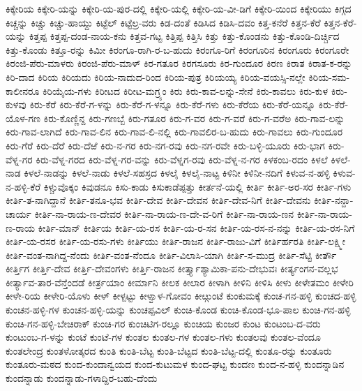 ಕಿಕ್ಕೇರಿಯ
ಕಿಕ್ಕೇರಿ-ಯನ್ನು
ಕಿಕ್ಕೇರಿ-ಯ-ಪುರ-ದಲ್ಲಿ
ಕಿಕ್ಕೇರಿ-ಯಲ್ಲಿ
ಕಿಕ್ಕೇರಿ-ಯ-ವೀ-ಡಿಗೆ
ಕಿಕ್ಕೇರಿ-ಯಿಂದ
ಕಿಕ್ಕೇರಿಯು
ಕಿಗ್ಗದ
ಕಿಚ್ಚನ್ನು
ಕಿಚ್ಚು
ಕಿಚ್ಚು-ಹಾಯ್ದು
ಕಿಟ್ಟೆಲ್
ಕಿಟ್ಟೆಲ್ರ-ವರು
ಕಿಡ-ದಂತೆ
ಕಿಡಿಸಿದ
ಕಿಡಿಸಿ-ದವಂ
ಕಿತ್ತ-ಕನೆರೆ
ಕಿತ್ತನ-ಕೆರೆ
ಕಿತ್ತನ-ಕೆರೆ-ಯನ್ನು
ಕಿತ್ತಪ್ಪ
ಕಿತ್ತಪ್ಪ-ದಂಡ-ನಾಯ-ಕನು
ಕಿತ್ತವ-ಗಟ್ಟ
ಕಿತ್ತಿಪ್ಪ
ಕಿತ್ತಿಸಿ
ಕಿತ್ತು
ಕಿತ್ತು-ಕೊಂಡನು
ಕಿತ್ತು-ಕೊಂಡಿ-ದಿರ್ಚ್ಚಿದ
ಕಿತ್ತು-ಕೊಂಡು
ಕಿತ್ತೂ-ರನ್ನು
ಕಿಮೀ
ಕಿರಂಗೂ-ರಾಗಿ-ರ-ಬ-ಹುದು
ಕಿರಂಗೂ-ರಿಗೆ
ಕಿರಂಗೂರಿನ
ಕಿರಂಗೂರು
ಕಿರಂಗೂರೇ
ಕಿರಂಜಿ-ಪೆರು-ಮಾಳರು
ಕಿರಂಜಿ-ಪೆರು-ಮಾಳ್
ಕಿರ-ಗತೂರ
ಕಿರಗಸೂರು
ಕಿರ-ಗುಂದೂರ
ಕಿರಣ
ಕಿರಾತ
ಕಿರಾತ-ಕ-ರನ್ನು
ಕಿರಿ-ದಾದ
ಕಿರಿಯ
ಕಿರಿಯದು
ಕಿರಿಯ-ನಾದುದ-ರಿಂದ
ಕಿರಿಯ-ಪುತ್ರ
ಕಿರಿಯಯ್ಯ
ಕಿರಿಯ-ವಯಸ್ಸಿ-ನಲ್ಲೇ
ಕಿರಿಯ-ಸಮ-ಕಾಲೀನರೂ
ಕಿರಿಯೈಯ-ಗಳು
ಕಿರೀಟದ
ಕಿರೀಟ-ಮಗ್ರ್ಯಂ
ಕಿರು
ಕಿರು-ಕಾವ-ಲನ್ನು-ಸೇನೆ
ಕಿರು-ಕಾವಲು
ಕಿರು-ಕುಳ
ಕಿರು-ಕುಳವು
ಕಿರು-ಕೆರೆ
ಕಿರು-ಕೆರೆ-ಗ-ಳನ್ನು
ಕಿರು-ಕೆರೆ-ಗ-ಳನ್ನೂ
ಕಿರು-ಕೆರೆ-ಗಳು
ಕಿರು-ಕೆರೆಯ
ಕಿರು-ಕೆರೆ-ಯನ್ನೂ
ಕಿರು-ಕೆರೆ-ಯೊಳ-ಗಣ
ಕಿರು-ಕೊಣ್ಣಿನ್ದ
ಕಿರು-ಗಣಬ್ಬೆ
ಕಿರು-ಗತೂರ
ಕಿರು-ಗ-ವರ
ಕಿರು-ಗ-ವರೆ
ಕಿರು-ಗ-ವರೆಅ
ಕಿರು-ಗಾವ-ಲನ್ನು
ಕಿರು-ಗಾವ-ಲಾಗಿದೆ
ಕಿರು-ಗಾವ-ಲಿನ
ಕಿರು-ಗಾವ-ಲಿ-ನಲ್ಲಿ
ಕಿರು-ಗಾವಲಿರ-ಬ-ಹುದು
ಕಿರು-ಗಾವಲು
ಕಿರು-ಗುಂದೂರ
ಕಿರು-ಗೆರೆ
ಕಿರು-ದೆರೆ
ಕಿರು-ದೆಱೆ
ಕಿರು-ನ-ಗರ
ಕಿರು-ನಗ-ರವು
ಕಿರು-ನಗ-ರವೇ
ಕಿರು-ಬಳ್ಳಿ-ಯೂರು
ಕಿರು-ಭಾಗ
ಕಿರು-ವೆಳ್ನ-ಗರ
ಕಿರು-ವೆಳ್ನ-ಗರದ
ಕಿರು-ವೆಳ್ನ-ಗರ-ವನ್ನು
ಕಿರು-ವೆಳ್ನಗ-ರವು
ಕಿರು-ವೆಳ್ನ-ನ-ಗರ
ಕಿಳಕಂಬ-ರದಂ
ಕಿಳಲೆ
ಕಿಳಲೆ-ನಾಡ
ಕಿಳಲೆ-ನಾಡನ್ನು
ಕಿಳಲೆ-ನಾಡು
ಕಿಳಲೆ-ಸಹಸ್ರದ
ಕಿಳಲೈ
ಕಿಳಲೈ-ನಾಟ್ಟ
ಕಿಳಿನೀ
ಕಿಳಿನೀ-ನದಿಗೆ
ಕಿಳುವ-ನ-ಹಳ್ಳಿ
ಕಿಳುವ-ನ-ಹಳ್ಳಿ-ಕೆರೆ
ಕಿಳ್ಚುವೊಕ್ಕಂ
ಕಿವುಡನೂ
ಕಿಸು-ಕಾಡು
ಕಿಸುಕಾಡೆಪ್ಪತ್ತು
ಕೀರ್ತನೆ-ಯಲ್ಲಿ
ಕೀರ್ತಿ
ಕೀರ್ತಿ-ಅರ-ಸರ
ಕೀರ್ತಿ-ಗಳು
ಕೀರ್ತಿ-ತ-ನಾಗಿದ್ದಾನೆ
ಕೀರ್ತಿ-ತನೂ-ಭವ
ಕೀರ್ತಿ-ದೇವ
ಕೀರ್ತಿ-ದೇವನ
ಕೀರ್ತಿ-ದೇವ-ನಿಗೆ
ಕೀರ್ತಿ-ದೇವನು
ಕೀರ್ತಿ-ನನ್ದಾ-ಚಾರ್ಯ
ಕೀರ್ತಿ-ನಾ-ರಾಯ-ಣ-ದೇವರ
ಕೀರ್ತಿ-ನಾ-ರಾಯ-ಣ-ದೇ-ವ-ರಿಗೆ
ಕೀರ್ತಿ-ನಾ-ರಾಯ-ಣನ
ಕೀರ್ತಿ-ನಾ-ರಾಯ-ಣ-ರಾಯ
ಕೀರ್ತಿ-ಮಾನ್
ಕೀರ್ತಿಯ
ಕೀರ್ತಿ-ಯ-ರಸ
ಕೀರ್ತಿ-ಯ-ರ-ಸನ
ಕೀರ್ತಿ-ಯ-ರಸ-ನ-ನನ್ನು
ಕೀರ್ತಿ-ಯ-ರಸ-ನಿಗೆ
ಕೀರ್ತಿ-ಯ-ರಸರ
ಕೀರ್ತಿ-ಯ-ರಸು-ಗಳು
ಕೀರ್ತಿಯು
ಕೀರ್ತಿ-ರಾಜನ
ಕೀರ್ತಿ-ರಾಜು-ವಿಗೆ
ಕೀರ್ತಿರ್ಹರತಿ
ಕೀರ್ತಿ-ಲಕ್ಷ್ಮೀ
ಕೀರ್ತಿ-ವಂತ-ನಾಗಿದ್ದ-ನೆಂದು
ಕೀರ್ತಿ-ವಂತ-ನೆಂದೂ
ಕೀರ್ತಿ-ವಿಲಾಸಿ-ಯಾಗಿ
ಕೀರ್ತಿ-ಸ-ಮುದ್ರ
ಕೀರ್ತಿ-ಸೆಟ್ಟಿ
ಕೀರ್ತೌ
ಕೀರ್ತ್ತಿಗ
ಕೀರ್ತ್ತಿ-ದೇವ
ಕೀರ್ತ್ತಿ-ದೇವಂಗಳು
ಕೀರ್ತ್ತಿ-ರಾಜನ
ಕೀರ್ತ್ತ್ಯಾಶ್ಯಾಮಿಕಾ-ಪನು-ದೇಭುವಃ
ಕೀರ್ತ್ಯಂಗನ-ವಲ್ಲಭ
ಕೀರ್ತ್ಯಾವ-ತಾರ-ವೆನ್ತೆಂದಡೆ
ಕೀರ್ತ್ರಯಾಂ
ಕೀರ್ಮಾನಿ
ಕೀಲಕ
ಕೀಲಾರ
ಕೀಳಾಗಿ
ಕೀಳಿನಿ
ಕೀಳಿಸಿ
ಕೀಳು
ಕೀಳೇತಮಂ
ಕೀಳೇರಿ
ಕೀಳೇ-ರಿಯ
ಕೀಳೇರಿ-ಯೊಳು
ಕೀಳ್
ಕೀಳ್ಪಟ್ಟು
ಕೀಳ್ವಾಳ-ಗೋವಂ
ಕೀೞ್ಗುಂಟೆ
ಕುಂಕುಮಕ್ಕೆ
ಕುಂಚ-ಗನ-ಹಳ್ಳಿ
ಕುಂಚದ-ಹಳ್ಳಿ
ಕುಂಚನ-ಹಳ್ಳಿ-ಗಳ
ಕುಂಚನ-ಹಳ್ಳಿ-ಯನ್ನು
ಕುಂಚಪ್ಪವಿಲ್
ಕುಂಚಿ-ಕೊಂಡ
ಕುಂಚಿ-ಕೊಂಡ-ಭೂ-ಪಾಲ
ಕುಂಚಿ-ಗನ-ಹಳ್ಳಿ
ಕುಂಚಿ-ಗನ-ಹಳ್ಳಿ-ಬೇಚಿರಾಕ್
ಕುಂಚಿ-ಗರ
ಕುಂಚಿಟಿಗ-ರಲ್ಲೂ
ಕುಂಚಿಯ
ಕುಂಜರ
ಕುಂಟ
ಕುಂಟಂಬ-ದ-ವರು
ಕುಂಟುಂಬ-ಗ-ಳನ್ನು
ಕುಂಟೆ
ಕುಂಟೆ-ಗಳ
ಕುಂತಲ
ಕುಂತಲ-ಗಳ
ಕುಂತಲ-ಗಳು
ಕುಂತಲವು
ಕುಂತಲ-ವೆಂದೂ
ಕುಂತಲೇಂದ್ರ
ಕುಂತಳೋತ್ಕರದ
ಕುಂತಿ
ಕುಂತಿ-ಬೆಟ್ಟ
ಕುಂತಿ-ಬೆಟ್ಟದ
ಕುಂತಿ-ಬೆಟ್ಟ-ದಲ್ಲಿ
ಕುಂತೂ-ರನ್ನು
ಕುಂತೂರು
ಕುಂತೂರು-ಮಠದ
ಕುಂದ-ಕುಂದಾನ್ವಯದ
ಕುಂದ-ಕುಟುಮಳ
ಕುಂದ-ಘಟ್ಟ
ಕುಂದಣ
ಕುಂದ-ನ-ಹಳ್ಳಿ
ಕುಂದನ್ನಾಡಿನ
ಕುಂದನ್ನಾಡು
ಕುಂದನ್ನಾಡು-ಗಳಾದ್ದಿರ-ಬಹು-ದೆಂದು
